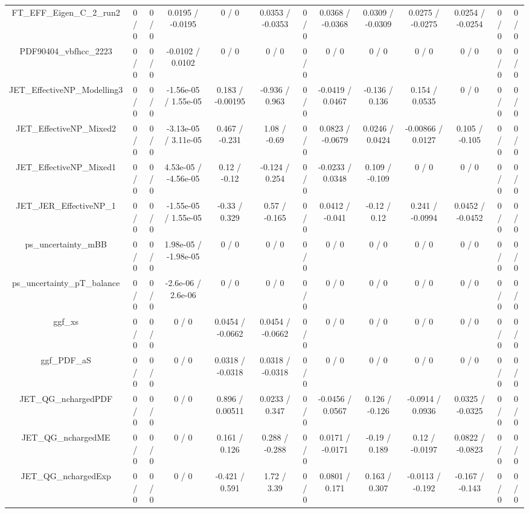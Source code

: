 \documentclass[10pt]{article}
\begin{document}
\begin{table}[htbp]
\begin{center}
\begin{tabular}{|c|c|c|c|c|c|c|c|c|c|c|c|c|}
  FT_EFF_Eigen_C_2_run2 & 0 / 0 & 0 / 0 & 0.0195 / -0.0195 & 0 / 0 & 0.0353 / -0.0353 & 0 / 0 & 0.0368 / -0.0368 & 0.0309 / -0.0309 & 0.0275 / -0.0275 & 0.0254 / -0.0254 & 0 / 0 & 0 / 0 \\ 
  PDF90404_vbfhcc_2223 & 0 / 0 & 0 / 0 & -0.0102 / 0.0102 & 0 / 0 & 0 / 0 & 0 / 0 & 0 / 0 & 0 / 0 & 0 / 0 & 0 / 0 & 0 / 0 & 0 / 0 \\ 
  JET_EffectiveNP_Modelling3 & 0 / 0 & 0 / 0 & -1.56e-05 / 1.55e-05 & 0.183 / -0.00195 & -0.936 / 0.963 & 0 / 0 & -0.0419 / 0.0467 & -0.136 / 0.136 & 0.154 / 0.0535 & 0 / 0 & 0 / 0 & 0 / 0 \\ 
  JET_EffectiveNP_Mixed2 & 0 / 0 & 0 / 0 & -3.13e-05 / 3.11e-05 & 0.467 / -0.231 & 1.08 / -0.69 & 0 / 0 & 0.0823 / -0.0679 & 0.0246 / 0.0424 & -0.00866 / 0.0127 & 0.105 / -0.105 & 0 / 0 & 0 / 0 \\ 
  JET_EffectiveNP_Mixed1 & 0 / 0 & 0 / 0 & 4.53e-05 / -4.56e-05 & 0.12 / -0.12 & -0.124 / 0.254 & 0 / 0 & -0.0233 / 0.0348 & 0.109 / -0.109 & 0 / 0 & 0 / 0 & 0 / 0 & 0 / 0 \\ 
  JET_JER_EffectiveNP_1 & 0 / 0 & 0 / 0 & -1.55e-05 / 1.55e-05 & -0.33 / 0.329 & 0.57 / -0.165 & 0 / 0 & 0.0412 / -0.041 & -0.12 / 0.12 & 0.241 / -0.0994 & 0.0452 / -0.0452 & 0 / 0 & 0 / 0 \\ 
  ps_uncertainty_mBB & 0 / 0 & 0 / 0 & 1.98e-05 / -1.98e-05 & 0 / 0 & 0 / 0 & 0 / 0 & 0 / 0 & 0 / 0 & 0 / 0 & 0 / 0 & 0 / 0 & 0 / 0 \\ 
  ps_uncertainty_pT_balance & 0 / 0 & 0 / 0 & -2.6e-06 / 2.6e-06 & 0 / 0 & 0 / 0 & 0 / 0 & 0 / 0 & 0 / 0 & 0 / 0 & 0 / 0 & 0 / 0 & 0 / 0 \\ 
  ggf_xs & 0 / 0 & 0 / 0 & 0 / 0 & 0.0454 / -0.0662 & 0.0454 / -0.0662 & 0 / 0 & 0 / 0 & 0 / 0 & 0 / 0 & 0 / 0 & 0 / 0 & 0 / 0 \\ 
  ggf_PDF_aS & 0 / 0 & 0 / 0 & 0 / 0 & 0.0318 / -0.0318 & 0.0318 / -0.0318 & 0 / 0 & 0 / 0 & 0 / 0 & 0 / 0 & 0 / 0 & 0 / 0 & 0 / 0 \\ 
  JET_QG_nchargedPDF & 0 / 0 & 0 / 0 & 0 / 0 & 0.896 / 0.00511 & 0.0233 / 0.347 & 0 / 0 & -0.0456 / 0.0567 & 0.126 / -0.126 & -0.0914 / 0.0936 & 0.0325 / -0.0325 & 0 / 0 & 0 / 0 \\ 
  JET_QG_nchargedME & 0 / 0 & 0 / 0 & 0 / 0 & 0.161 / 0.126 & 0.288 / -0.288 & 0 / 0 & 0.0171 / -0.0171 & -0.19 / 0.189 & 0.12 / -0.0197 & 0.0822 / -0.0823 & 0 / 0 & 0 / 0 \\ 
  JET_QG_nchargedExp & 0 / 0 & 0 / 0 & 0 / 0 & -0.421 / 0.591 & 1.72 / 3.39 & 0 / 0 & 0.0801 / 0.171 & 0.163 / 0.307 & -0.0113 / -0.192 & -0.167 / -0.143 & 0 / 0 & 0 / 0 \\ 

\end{tabular}
\end{center}
\end{table}
\end{document}
